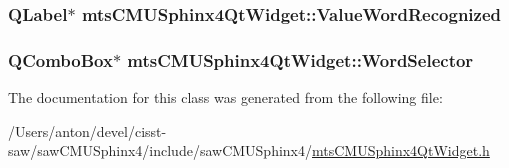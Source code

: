\subsubsection[{Value\+Word\+Recognized}]{\setlength{\rightskip}{0pt plus 5cm}Q\+Label$\ast$ mts\+C\+M\+U\+Sphinx4\+Qt\+Widget\+::\+Value\+Word\+Recognized}\label{classmts_c_m_u_sphinx4_qt_widget_a2fb5f8ac612123f74c38a522309ecf80}
\hypertarget{classmts_c_m_u_sphinx4_qt_widget_a3d6acb7e4e230bd1b0b3ca90aba15522}{}
\subsubsection[{Word\+Selector}]{\setlength{\rightskip}{0pt plus 5cm}Q\+Combo\+Box$\ast$ mts\+C\+M\+U\+Sphinx4\+Qt\+Widget\+::\+Word\+Selector}\label{classmts_c_m_u_sphinx4_qt_widget_a3d6acb7e4e230bd1b0b3ca90aba15522}


The documentation for this class was generated from the following file\+:\begin{DoxyCompactItemize}
\item 
/\+Users/anton/devel/cisst-\/saw/saw\+C\+M\+U\+Sphinx4/include/saw\+C\+M\+U\+Sphinx4/\hyperlink{mts_c_m_u_sphinx4_qt_widget_8h}{mts\+C\+M\+U\+Sphinx4\+Qt\+Widget.\+h}\end{DoxyCompactItemize}
